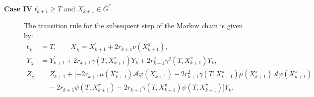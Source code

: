 \documentclass{article}
\theoremstyle{definition}
\numberwithin{equation}{section}
\begin{document}
\begin{description}
 \item[\textbf{Case IV} $t^{'}_{k+1} \geq T$ and $X^{'}_{k+1} \in \bar{G}^c$. ]

 
The transition rule for the subsequent step of the Markov chain is given by:
\begin{align}
    t_{\chi} &= T, \quad \quad 
    X_{\chi} = X^{'}_{k+1} + 2 r_{k+1}\nu(X^{\pi}_{k+1}), \label{stikcy_euler_eqn_3.16} \\ 
    Y_{\chi} &= Y_{k+1}^{'} + 2 r_{k+1}\gamma(T, X^{\pi}_{k+1})Y_k + 2 r_{k+1}^2\gamma^2(T, X^{\pi}_{k+1})Y_k, \label{sticky_euler_eqn_3.17}\\
    Z_{\chi} &= Z_{k+1}^{'} +[-2r_{k+1}\mu(X^{\pi}_{k+1})\mathcal{A}\varphi(X^{\pi}_{k+1})-2r^{2}_{k+1}\gamma(T, X^{\pi}_{k+1})\mu(X^{\pi}_{k+1})\mathcal{A}\varphi(X^{\pi}_{k+1}) \nonumber \\  &  \;\;\;\; - 2r_{k+1}\psi(T, X^{\pi}_{k+1})  - 2r_{k+1}\gamma(T, X^{\pi}_{k+1})\psi(T, X^{\pi}_{k+1})]Y_k. \label{sticky_euler_eqn_3.18}
\end{align}


 
\end{description}








\setlength{\abovecaptionskip}{5pt}
\end{document}
